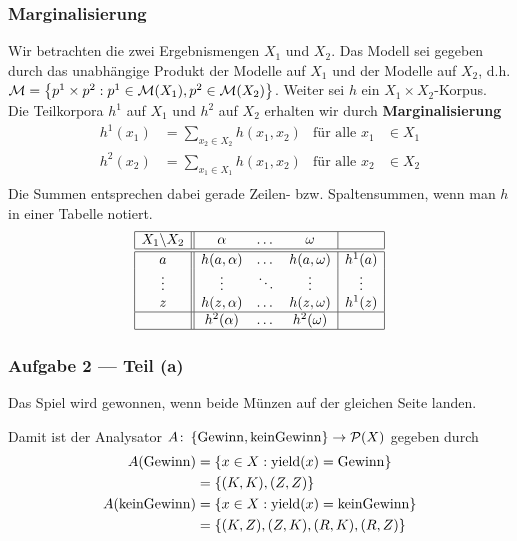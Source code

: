 \documentclass{beamer}
\DeclareMathOperator{\yield}{yield}
\DeclareMathOperator{\win}{Gewinn}
\DeclareMathOperator{\nowin}{kein Gewinn}
\begin{document}
\begin{frame} \frametitle{Marginalisierung}
	\justifying \footnotesize
	Wir betrachten die zwei Ergebnismengen $X_1$ und $X_2$. Das Modell sei gegeben durch das unabhängige Produkt der Modelle auf $X_1$ und der Modelle auf $X_2$, d.h. $\mathcal{M} = \left\{  p^1 \times p^2 : p^1 \in \mathcal{M}(X_1), p^2 \in \mathcal{M}(X_2) \right\}$. Weiter sei $h$ ein $X_1 \times X_2$-Korpus. Die Teilkorpora $h^1$ auf $X_1$ und $h^2$ auf $X_2$ erhalten wir durch \textbf{Marginalisierung}
	\begin{equation*}
		\begin{aligned}
			h^1(x_1) &= \sum_{x_2 \in X_2} h(x_1, x_2) & \text{für alle } x_1 &\in X_1 \\
			h^2(x_2) &= \sum_{x_1 \in X_1} h(x_1, x_2) & \text{für alle } x_2 &\in X_2 \\
		\end{aligned}
	\end{equation*}
	\pause
	Die Summen entsprechen dabei gerade Zeilen- bzw. Spaltensummen, wenn man $h$ in einer Tabelle notiert.
	\begin{equation*}
		\begin{array}{|c||ccc|c|}
		\hline
			X_1 \backslash X_2 & \alpha & \dots & \omega & \\ \hline \hline
			a & h(a,\alpha) & \dots & h(a,\omega) & h^1(a) \\
			\vdots &\vdots & \ddots & \vdots & \vdots \\
			z & h(z,\alpha) & \dots & h(z,\omega) & h^1(z) \\ \hline
			& h^2(\alpha) & \dots & h^2(\omega) & \\ \hline
		\end{array}
	\end{equation*}	
\end{frame}

\begin{frame} \frametitle{Aufgabe 2 --- Teil (a)}
	\justifying \small	
	Das Spiel wird gewonnen, wenn beide Münzen auf der gleichen Seite landen.
	
	\pause
	
	Damit ist der Analysator $A \colon \menge{\win, \nowin} \to \mathcal{P}(X)$ gegeben durch
	\begin{equation*}
		\begin{aligned}
			A(\win) &= \menge{x \in X: \yield(x) = \win} \\
					&= \menge{(K,K), (Z,Z)} \\
			A(\nowin) &= \menge{x \in X: \yield(x) = \nowin} \\
					  &= \menge{(K,Z), (Z,K),(R,K),(R,Z)}
		\end{aligned}
	\end{equation*}
\end{frame}
\end{document}
